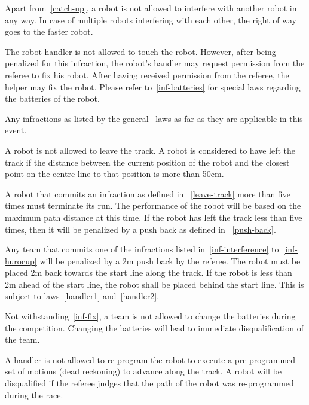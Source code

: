 \documentclass[12pt]{hurocup}
\begin{document}
\begin{lawlist}[MR]

\item \label{inf-interference} Apart from~\ref{catch-up}, a robot is
  not allowed to interfere with another robot in any way. In case of
  multiple robots interfering with each other, the right of way goes
  to the faster robot.

\item \label{inf-fix} The robot handler is not allowed to touch the
  robot. However, after being penalized for this infraction, the
  robot's handler may request permission from the referee to fix his
  robot. After having received permission from the referee, the helper
  may fix the robot. Please refer to~\ref{inf-batteries} for special
  laws regarding the batteries of the robot.

\item \label{inf-hurocup} Any infractions as listed by the general
  \HuroCup\ laws as far as they are applicable in this event.

\item \label{leave-track} A robot is not allowed to leave the track. A
  robot is considered to have left the track if the distance between
  the current position of the robot and the closest point on the
  centre line to that position is more than 50cm. 

\item \label{leave-track-5} A robot that commits an infraction as
  defined in ~\ref{leave-track} more than five times must terminate
  its run. The performance of the robot will be based on the maximum
  path distance at this time. If the robot has left the track less
  than five times, then it will be penalized by a push back as defined
  in ~\ref{push-back}.

\item \label{push-back} Any team that commits one of the infractions
  listed in~\ref{inf-interference} to~\ref{inf-hurocup} will be
  penalized by a 2m push back by the referee. The robot must be placed
  2m back towards the start line along the track. If the robot is less
  than 2m ahead of the start line, the robot shall be placed behind
  the start line. This is subject to laws~\ref{handler1}
  and~\ref{handler2}.

\item \label{inf-batteries} Not withstanding~\ref{inf-fix}, a team is
  not allowed to change the batteries during the competition. Changing
  the batteries will lead to immediate disqualification of the team.

\item \label{dead-reckoning} A handler is not allowed to re-program
  the robot to execute a pre-programmed set of motions (dead
  reckoning) to advance along the track. A robot will be disqualified
  if the referee judges that the path of the robot was re-programmed
  during the race.

\end{lawlist}
\end{document}
